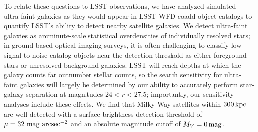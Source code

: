 To relate these questions to LSST observations, we have analyzed simulated ultra-faint galaxies as they would appear in LSST WFD coadd object catalogs to quantify LSST's ability to detect nearby satellite galaxies. %
We detect ultra-faint galaxies as arcminute-scale statistical overdensities of individually resolved stars; in ground-based optical imaging surveys, it is often challenging to classify low signal-to-noise catalog objects near the detection threshold as either foreground stars or unresolved background galaxies. LSST will reach depths at which the galaxy counts far outnumber stellar counts, so the search sensitivity for ultra-faint galaxies will largely be determined by our ability to accurately perform star-galaxy separation at magnitudes $24 < r < 27.5$; importantly, our sensitivity analyses include these effects. 
We find that Milky Way satellites within $300\mathrm{\,kpc}$ are well-detected with a surface brightness detection threshold of $\mu = 32\ \rm{mag\ arcsec}^{-2}$ \citep{0912.0201} and an absolute magnitude cutoff of $M_V = 0\mathrm{\,mag}$.

